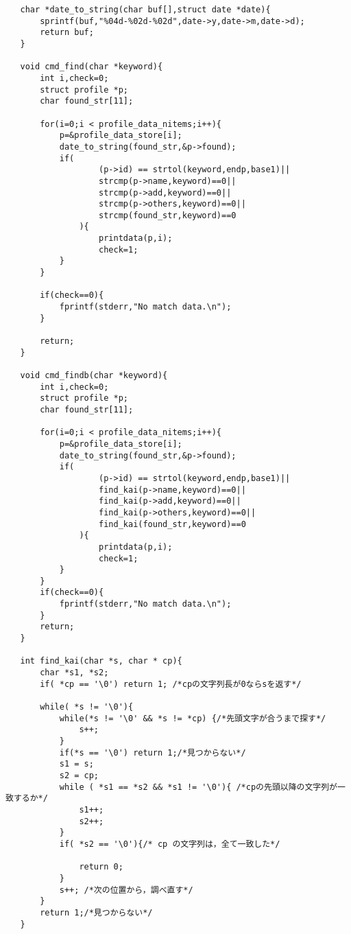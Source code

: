 \documentclass[a4j,11pt]{jarticle}
\begin{document}
\begin{lstlisting}
   char *date_to_string(char buf[],struct date *date){
       sprintf(buf,"%04d-%02d-%02d",date->y,date->m,date->d);
       return buf;
   }
   
   void cmd_find(char *keyword){
       int i,check=0;
       struct profile *p;
       char found_str[11];
       
       for(i=0;i < profile_data_nitems;i++){
           p=&profile_data_store[i];
           date_to_string(found_str,&p->found);
           if( 
                   (p->id) == strtol(keyword,endp,base1)||
                   strcmp(p->name,keyword)==0||
                   strcmp(p->add,keyword)==0||
                   strcmp(p->others,keyword)==0||
                   strcmp(found_str,keyword)==0
               ){
                   printdata(p,i);
                   check=1;
           }
       }
       
       if(check==0){
           fprintf(stderr,"No match data.\n");
       }
       
       return;
   }
   
   void cmd_findb(char *keyword){
       int i,check=0;
       struct profile *p;
       char found_str[11];
       
       for(i=0;i < profile_data_nitems;i++){
           p=&profile_data_store[i];
           date_to_string(found_str,&p->found);
           if( 
                   (p->id) == strtol(keyword,endp,base1)||
                   find_kai(p->name,keyword)==0||
                   find_kai(p->add,keyword)==0||
                   find_kai(p->others,keyword)==0||
                   find_kai(found_str,keyword)==0
               ){
                   printdata(p,i);
                   check=1;
           }
       }
       if(check==0){
           fprintf(stderr,"No match data.\n");
       }
       return;
   }
   
   int find_kai(char *s, char * cp){
       char *s1, *s2;
       if( *cp == '\0') return 1; /*cpの文字列長が0ならsを返す*/ 
   
       while( *s != '\0'){
           while(*s != '\0' && *s != *cp) {/*先頭文字が合うまで探す*/
               s++;
           }
           if(*s == '\0') return 1;/*見つからない*/
           s1 = s;
           s2 = cp;
           while ( *s1 == *s2 && *s1 != '\0'){ /*cpの先頭以降の文字列が一致するか*/
               s1++;
               s2++;
           }
           if( *s2 == '\0'){/* cp の文字列は，全て一致した*/
       
               return 0;
           }
           s++; /*次の位置から，調べ直す*/
       }
       return 1;/*見つからない*/
   }
   

\end{lstlisting}
\end{document}
